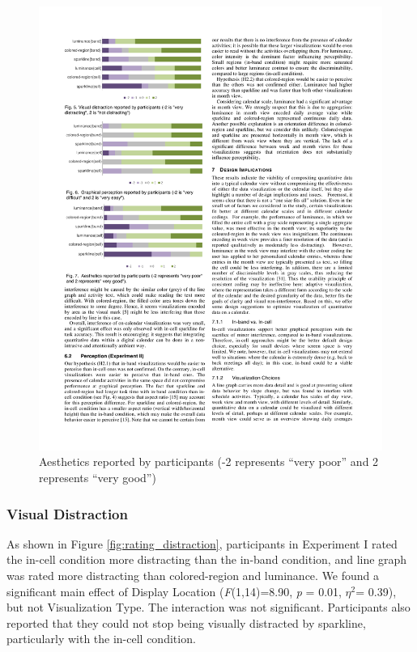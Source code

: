 \documentclass[12pt,oneside]{book}
\begin{document}
\begin{figure}
\centering
\includegraphics[width=\columnwidth]{figures/rating_aesthetics}
\caption{ Aesthetics reported by participants (-2 represents ``very poor'' and 2 represents ``very good'')}
\label{fig:rating_aesthetics}
\end{figure}

\subsubsection{Visual Distraction}
As shown in Figure \ref{fig:rating_distraction}, participants in Experiment I rated the in-cell condition more distracting than the in-band condition, and line graph was rated more distracting than colored-region and luminance. We found a significant main effect of Display Location (\textit{F}(1,14)=8.90, \textit{p} = 0.01, $\eta^2$= 0.39), but not Visualization Type. The interaction was not significant. Participants also reported that they could not stop being visually distracted by sparkline, particularly with the in-cell condition.
\end{document}
